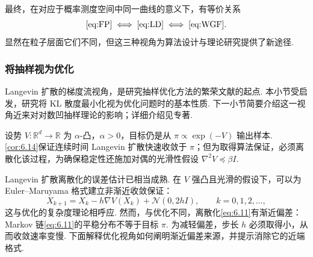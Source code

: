 最终，在对应于概率测度空间中同一曲线的意义下，有等价关系
$$\text{\eqref{eq:FP}}\iff\text{\eqref{eq:LD}}\iff\text{\eqref{eq:WGF}}.$$
显然在粒子层面它们不同，但这三种视角为算法设计与理论研究提供了新途径.

\subsubsection{将抽样视为优化}\label{sec:6.2.2}

Langevin 扩散的梯度流视角，是研究抽样优化方法的繁荣文献的起点. 本小节受\cite{ref324}启发，研究将 KL 散度最小化视为优化问题时的基本性质. 下一小节简要介绍这一视角近来对对数凹抽样理论的影响；详细介绍见专著\cite{ref77}.

设势 $V:\mathbb R^d\to\mathbb R$ 为 $\alpha$-凸，$\alpha>0$，目标仍是从 $\pi\propto\exp(-V)$ 输出样本. \autoref{cor:6.14}保证连续时间 Langevin 扩散快速收敛于 $\pi$；但为取得算法保证，必须离散化该过程，为确保稳定性还施加对偶的光滑性假设 $\nabla^2V\preceq\beta I$.

Langevin 扩散离散化的误差估计已相当成熟. 在 $V$ 强凸且光滑的假设下，可以为 Euler--Maruyama 格式建立非渐近收敛保证：
\begin{equation}\label{eq:6.11}
X_{k+1}=X_k-h\nabla V(X_k)+\mathcal N(0,2hI),
\qquad k=0,1,2,\ldots,
\end{equation}
这与优化的复杂度理论相呼应\cite{ref236}. 然而，与优化不同，离散化\eqref{eq:6.11}有渐近偏差：Markov 链\eqref{eq:6.11}的平稳分布不等于目标 $\pi$. 为减轻偏差，步长 $h$ 必须取得小，从而收敛速率变慢. 下面解释优化视角如何阐明渐近偏差来源，并提示消除它的近端格式.

